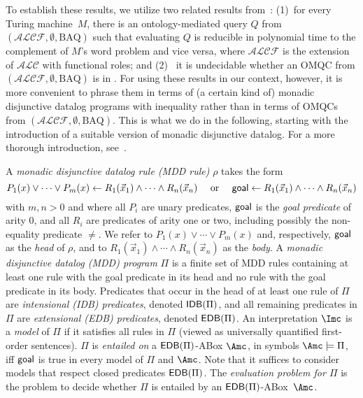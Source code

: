\documentclass{lmcs}
\theoremstyle{definition}
\begin{document}
To establish these results, we utilize two related results
from~\cite{DBLP:journals/lmcs/LutzW17,DBLP:journals/tods/BienvenuCLW14}:
(1)~for every \np Turing machine~$M$, there is an ontology-mediated
query $Q$ from $(\mathcal{ALCF},\emptyset,\text{BAQ})$ such that
evaluating $Q$ is reducible in polynomial time to the complement of
$M$'s word problem and vice versa, where $\mathcal{ALCF}$ is the
extension of $\mathcal{ALC}$ with functional roles; and (2)~ it is
undecidable whether an OMQC from
$(\mathcal{ALCF},\emptyset,\text{BAQ})$ is in \ptime. For using these
results in our context, however, it is more convenient to phrase them
in terms of (a certain kind of) monadic disjunctive datalog programs
with inequality rather than in terms of OMQCs from
$(\mathcal{ALCF},\emptyset,\text{BAQ})$. This is what we do in the
following, starting with the introduction of a suitable version of
monadic disjunctive datalog.  For a more thorough introduction, see~\cite{EiterGottlob}.

A \emph{monadic disjunctive datalog rule (MDD
  rule)} $\rho$ takes the form
$$
P_1(x) \vee \cdots \vee P_m(x) \leftarrow R_1(\vec{x}_{1})\land \cdots\land R_n(\vec{x}_n) \quad \mbox{ or } \quad {\sf goal}\leftarrow R_1(\vec{x}_{1})\land \cdots\land R_n(\vec{x}_n)
$$
with $m,n>0$ and where all $P_{i}$ are unary predicates, ${\sf goal}$ is the \emph{goal predicate} of arity $0$,
and all $R_{i}$ are predicates of arity one or two, including possibly the non-equality predicate $\not=$.
We refer to $P_1(x) \vee \cdots \vee P_m(x)$ and, respectively, ${\sf goal}$ as the \emph{head} of $\rho$, and to $R_1(\vec{x}_{1}) \wedge \cdots \wedge
R_n(\vec{x}_{n})$ as the \emph{body}. A \emph{monadic disjunctive
  datalog (MDD) program} $\Pi$ is a finite set of MDD rules containing at least one rule with the goal predicate in its head and
no rule with the goal predicate in its body. Predicates that occur in the head of at
least one rule of $\Pi$ are \emph{intensional (IDB) predicates}, denoted ${\sf IDB}(\Pi)$, and
all remaining predicates in $\Pi$ are \emph{extensional (EDB) predicates}, denoted ${\sf EDB}(\Pi)$. 
An interpretation $\Imc$ is a \emph{model} of $\Pi$ if it satisfies all rules in $\Pi$ (viewed as universally quantified first-order sentences).
$\Pi$ is \emph{entailed on} a ${\sf EDB}(\Pi)$-ABox $\Amc$, in symbols $\Amc\models \Pi$, iff ${\sf goal}$ is true in every model of $\Pi$ and $\Amc$.
Note that it suffices to consider models that respect closed predicates ${\sf EDB}(\Pi)$. 
The \emph{evaluation problem for $\Pi$} is the problem to decide whether $\Pi$ is entailed by an ${\sf EDB}(\Pi)$-ABox~$\Amc$.
\end{document}
